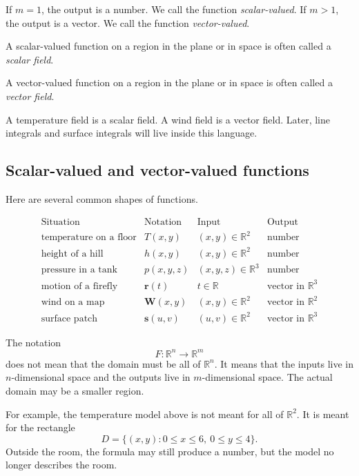 If \(m=1\), the output is a number.  We call the function \emph{scalar-valued}.
If \(m>1\), the output is a vector.  We call the function \emph{vector-valued}.

\begin{definition}
A scalar-valued function on a region in the plane or in space is often called a
\emph{scalar field}.

A vector-valued function on a region in the plane or in space is often called a
\emph{vector field}.
\end{definition}

A temperature field is a scalar field.  A wind field is a vector field.  Later, line
integrals and surface integrals will live inside this language.

\subsection{Scalar-valued and vector-valued functions}

Here are several common shapes of functions.

\[
\begin{array}{c|c|c|c}
\text{Situation} & \text{Notation} & \text{Input} & \text{Output} \\ \hline
\text{temperature on a floor} & T(x,y) & (x,y)\in\mathbb R^2 & \text{number}\\[1mm]
\text{height of a hill} & h(x,y) & (x,y)\in\mathbb R^2 & \text{number}\\[1mm]
\text{pressure in a tank} & p(x,y,z) & (x,y,z)\in\mathbb R^3 & \text{number}\\[1mm]
\text{motion of a firefly} & \mathbf r(t) & t\in\mathbb R & \text{vector in }\mathbb R^3\\[1mm]
\text{wind on a map} & \mathbf W(x,y) & (x,y)\in\mathbb R^2 & \text{vector in }\mathbb R^2\\[1mm]
\text{surface patch} & \mathbf s(u,v) & (u,v)\in\mathbb R^2 & \text{vector in }\mathbb R^3
\end{array}
\]

The notation
\[
    F:\mathbb R^n\to\mathbb R^m
\]
does not mean that the domain must be all of \(\mathbb R^n\).  It means that the
inputs live in \(n\)-dimensional space and the outputs live in \(m\)-dimensional space.
The actual domain may be a smaller region.

For example, the temperature model above is not meant for all of \(\mathbb R^2\).
It is meant for the rectangle
\[
    D=\{(x,y):0\le x\le 6,\ 0\le y\le 4\}.
\]
Outside the room, the formula may still produce a number, but the model no longer
describes the room.

